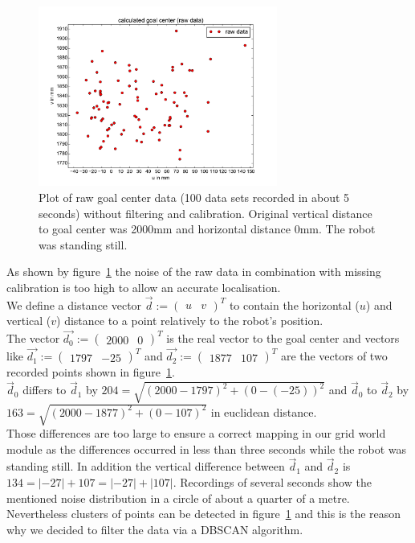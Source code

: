\documentclass[lnicst,a4paper]{svmultln}
\begin{document}
\begin{figure}
 	\centerline{\includegraphics[width=0.7\textwidth]{noise_data_plot.pdf}}
	{\caption{Plot of raw goal center data (100 data sets recorded in about 5 seconds) without filtering and calibration. Original vertical distance to goal center was 2000mm and horizontal distance 0mm. The robot was standing still.}
	\label{fig:noise1}}
\end{figure}

As shown by figure~\ref{fig:noise1} the noise of the raw data in combination with missing calibration is too high to allow an accurate localisation.
\\
We define a distance vector $\vec{d} := \left( \begin{array}{cc} u & v \end{array} \right)^{T}$ to contain the horizontal ($u$) and vertical ($v$) distance to a point relatively to the robot's position. 
\\
The vector 
$\vec{d_{0}} := \left( \begin{array}{cc} 2000 & 0 \end{array} \right)^{T}$ is the real vector to the goal center and vectors like
$\vec{d_{1}} := \left( \begin{array}{cc} 1797 & -25 \end{array} \right)^{T}$ and
$\vec{d_{2}} := \left( \begin{array}{cc} 1877 & 107 \end{array} \right)^{T}$
are the vectors of two recorded points shown in figure~\ref{fig:noise1}.
\\
$\vec{d}_{0}$ differs to $\vec{d}_{1}$ by
$ 204 = \sqrt{(2000 - 1797)^2 + (0 - (-25))^2}$ and 
$\vec{d}_{0}$ to $\vec{d}_{2}$
by $ 163 = \sqrt{(2000 - 1877)^2 + (0 - 107)^2}$
in euclidean distance.
\\
Those differences are too large to ensure a correct mapping in our grid world module as the differences occurred in less than three seconds while the robot was standing still. In addition the vertical difference between $\vec{d}_{1}$ and $\vec{d}_{2}$ is $ 134 = |-27| + 107 = |-27| + |107|$. Recordings of several seconds show the mentioned noise distribution in a circle of about a quarter of a metre.
\\
Nevertheless clusters of points can be detected in figure~\ref{fig:noise1} and this is the reason why we decided to filter the data via a DBSCAN algorithm.
\end{document}
